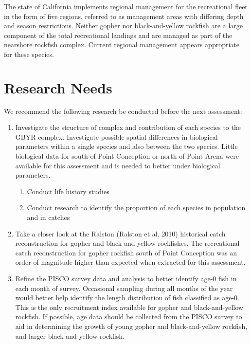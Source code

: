 \documentclass[12pt,]{article}
\begin{document}
The state of California implements regional management for the
recreational fleet in the form of five regions, referred to as
management areas with differing depth and season restrictions. Neither
gopher nor black-and-yellow rockfish are a large component of the total
recreational landings and are managed as part of the nearshore rockfish
complex. Current regional management appears appropriate for these
species.

\section{Research Needs}\label{research-needs}

We recommend the following research be conducted before the next
assessment:

\begin{enumerate}

\item Investigate the structure of complex and contribution of each species to the 
GBYR complex. Investigate possible spatial differences in biological parameters within 
a single species and also between the two species.  Little biological data for south of 
Point Conception or north of Point Arena were available for this assessment and is needed 
to better under biological parameters. 
    \begin{enumerate}
     \item Conduct life history studies
     \item Conduct research to identify the proportion of each species in population and in catches
    \end{enumerate}

\item Take a closer look at the Ralston (Ralston et al. 2010) historical catch reconstruction 
for gopher and black-and-yellow rockfishes.  The recreational catch reconstruction for 
gopher rockfish south of Point Conception was an order of magnitude higher than expected 
when extracted for this assessment.  

\item Refine the PISCO survey data and analysis to better identify age-0 fish in each 
month of survey.  Occasional sampling during all months of the year would better help 
identify the length distribution of fish classified as age-0. This is the only recruitment 
index available for gopher and black-and-yellow rockfish. If possible, age data should be 
collected from the PISCO survey to aid in determining the growth of young gopher and 
black-and-yellow rockfish, and larger black-and-yellow rockfish.


\end{enumerate}
\end{document}
